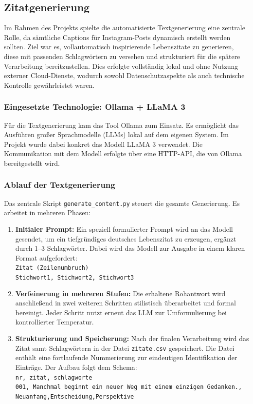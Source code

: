 \documentclass[a4paper,12pt]{article}
\begin{document}
\subsection{Zitatgenerierung}

Im Rahmen des Projekts spielte die automatisierte Textgenerierung eine zentrale Rolle, da sämtliche Captions für Instagram-Posts dynamisch erstellt werden sollten. Ziel war es, vollautomatisch inspirierende Lebenszitate zu generieren, diese mit passenden Schlagwörtern zu versehen und strukturiert für die spätere Verarbeitung bereitzustellen. Dies erfolgte vollständig lokal und ohne Nutzung externer Cloud-Dienste, wodurch sowohl Datenschutzaspekte als auch technische Kontrolle gewährleistet waren.

\subsubsection*{Eingesetzte Technologie: Ollama + LLaMA 3}

Für die Textgenerierung kam das Tool Ollama zum Einsatz. Es ermöglicht das Ausführen großer Sprachmodelle (LLMs) lokal auf dem eigenen System. Im Projekt wurde dabei konkret das Modell LLaMA 3 verwendet. Die Kommunikation mit dem Modell erfolgte über eine HTTP-API, die von Ollama bereitgestellt wird.

\subsubsection*{Ablauf der Textgenerierung}

Das zentrale Skript \texttt{generate\_content.py} steuert die gesamte Generierung. Es arbeitet in mehreren Phasen:

\begin{enumerate}
    \item \textbf{Initialer Prompt:} Ein speziell formulierter Prompt wird an das Modell gesendet, um ein tiefgründiges deutsches Lebenszitat zu erzeugen, ergänzt durch 1–3 Schlagwörter. Dabei wird das Modell zur Ausgabe in einem klaren Format aufgefordert: \\
    \texttt{Zitat (Zeilenumbruch)} \\
    \texttt{Stichwort1, Stichwort2, Stichwort3}

    \item \textbf{Verfeinerung in mehreren Stufen:} Die erhaltene Rohantwort wird anschließend in zwei weiteren Schritten stilistisch überarbeitet und formal bereinigt. Jeder Schritt nutzt erneut das LLM zur Umformulierung bei kontrollierter Temperatur.

    \item \textbf{Strukturierung und Speicherung:} Nach der finalen Verarbeitung wird das Zitat samt Schlagwörtern in der Datei \texttt{zitate.csv} gespeichert. Die Datei enthält eine fortlaufende Nummerierung zur eindeutigen Identifikation der Einträge. Der Aufbau folgt dem Schema: \\
    \texttt{nr, zitat, schlagworte} \\
    \texttt{001, Manchmal beginnt ein neuer Weg mit einem einzigen Gedanken., Neuanfang,Entscheidung,Perspektive}
\end{enumerate}
\end{document}

